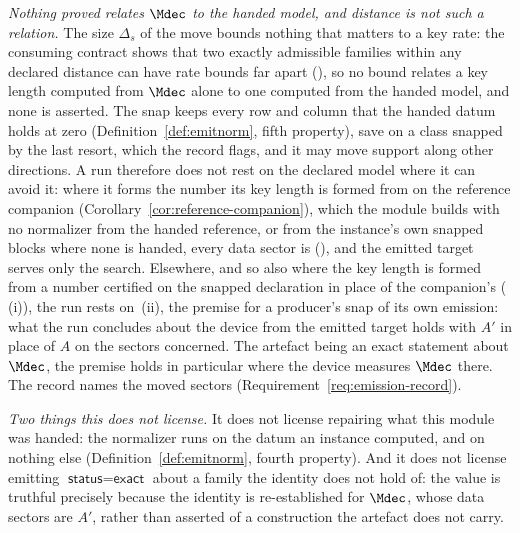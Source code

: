 \begin{remark}
\emph{Nothing proved relates $\Mdec$ to the handed model, and distance is not
such a relation.} The size $\Delta_s$ of the move bounds nothing that
matters to a key rate: the consuming contract shows that two exactly
admissible families within any declared distance can have rate bounds far
apart (), so no bound relates a key length
computed from $\Mdec$ alone to one computed from the handed model, and none
is asserted. The snap keeps every row and column that the handed datum holds
at zero (Definition~\ref{def:emitnorm}, fifth property), save on a class
snapped by the last resort, which the record flags, and it may move support
along other directions. A run therefore does not rest on the declared model
where it can avoid it: where it forms the number its key length is formed
from on the reference companion (Corollary~\ref{cor:reference-companion}),
which the module builds with no normalizer from the handed reference, or from
the instance's own snapped blocks where none is handed, every data sector is 
(), and the emitted target serves
only the search. Elsewhere, and so also where the key length is formed from
a number certified on the snapped declaration in place of the companion's
(\,(i)), the run rests on
\,(ii), the premise for a
producer's snap of its own emission: what the run concludes about the device
from the emitted target holds with $A'$ in place of $A$ on the sectors
concerned. The artefact being an exact statement about $\Mdec$, the premise
holds in particular where the device measures $\Mdec$ there. The record
names the moved sectors (Requirement~\ref{req:emission-record}).

\emph{Two things this does not license.} It does not license repairing what
this module was handed: the normalizer runs on the datum an instance computed,
and on nothing else (Definition~\ref{def:emitnorm}, fourth property). And it
does not license emitting $\textsf{status}=\textsf{exact}$ about a family the
identity does not hold of: the value is truthful precisely because the
identity is re-established for $\Mdec$, whose data sectors are $A'$, rather
than asserted of a construction the artefact does not carry.
\end{remark}
